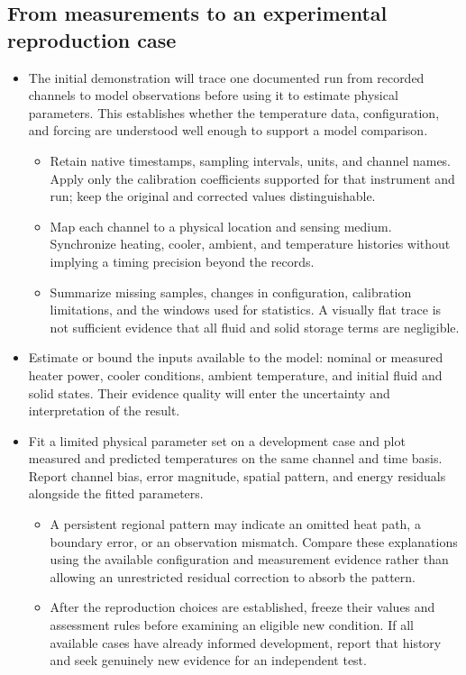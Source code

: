 \subsection{From measurements to an experimental reproduction case}\label{subsec:experimental-reproduction-case}
\begin{itemize}[leftmargin=*]
\item The initial demonstration will trace one documented run from recorded channels to model observations before using it to estimate physical parameters. This establishes whether the temperature data, configuration, and forcing are understood well enough to support a model comparison.
\begin{itemize}
\item Retain native timestamps, sampling intervals, units, and channel names. Apply only the calibration coefficients supported for that instrument and run; keep the original and corrected values distinguishable.
\item Map each channel to a physical location and sensing medium. Synchronize heating, cooler, ambient, and temperature histories without implying a timing precision beyond the records.
\item Summarize missing samples, changes in configuration, calibration limitations, and the windows used for statistics. A visually flat trace is not sufficient evidence that all fluid and solid storage terms are negligible.
\end{itemize}
\item Estimate or bound the inputs available to the model: nominal or measured heater power, cooler conditions, ambient temperature, and initial fluid and solid states. Their evidence quality will enter the uncertainty and interpretation of the result.
\item Fit a limited physical parameter set on a development case and plot measured and predicted temperatures on the same channel and time basis. Report channel bias, error magnitude, spatial pattern, and energy residuals alongside the fitted parameters.
\begin{itemize}
\item A persistent regional pattern may indicate an omitted heat path, a boundary error, or an observation mismatch. Compare these explanations using the available configuration and measurement evidence rather than allowing an unrestricted residual correction to absorb the pattern.
\item After the reproduction choices are established, freeze their values and assessment rules before examining an eligible new condition. If all available cases have already informed development, report that history and seek genuinely new evidence for an independent test.
\end{itemize}
\end{itemize}

